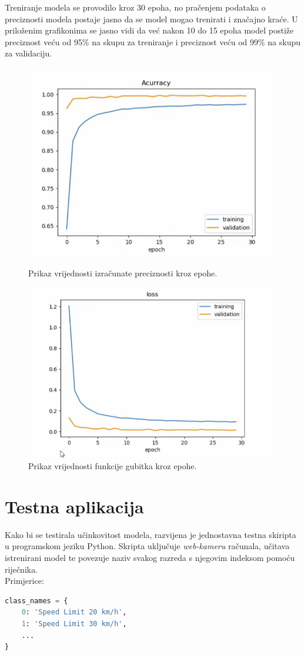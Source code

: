 \documentclass[times, utf8, zavrsni]{fer}
\begin{document}
Treniranje modela se provodilo kroz 30 epoha, no pračenjem podataka o preciznosti modela postaje jasno da se model mogao trenirati i značajno kraće.
U priloženim grafikonima se jasno vidi da već nakon 10 do 15 epoha model postiže preciznost veću od 95\% na skupu za treniranje i preciznost veću od 99\% na skupu za validaciju.
\begin{figure}[h!]
  \includegraphics[width=\linewidth,trim=4 4 4 4,clip]{images/acc_plot.jpeg}
  \caption{Prikaz vrijednosti izračunate preciznosti kroz epohe.}
  \includegraphics[width=\linewidth,trim=4 4 4 4,clip]{images/loss_plot.jpeg}
  \caption{Prikaz vrijednosti funkcije gubitka kroz epohe.}
\end{figure} 

\pagebreak
\section{Testna aplikacija}
Kako bi se testirala učinkovitost modela, razvijena je jednostavna testna skiripta u programskom jeziku Python. Skripta uključuje  \emph{web-kameru} računala, učitava istrenirani model te povezuje naziv svakog razreda s njegovim indeksom pomoću riječnika.
\\Primjerice:
\begin{lstlisting}[language=Python]
class_names = {
    0: 'Speed Limit 20 km/h',
    1: 'Speed Limit 30 km/h',
    ...
}
\end{lstlisting}
\end{document}
